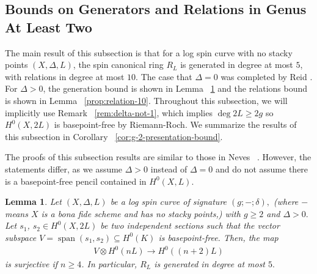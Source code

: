 \documentclass{amsart}
\theoremstyle{plain}
\newtheorem{lem}[thm]{Lemma}
\theoremstyle{definition}
\theoremstyle{remark}
\numberwithin{equation}{section}
\newcommand\ssec{\subsection}
\newcommand{\halfcan}{L}
\DeclareMathOperator{\newspan}{span}
\begin{document}
\ssec{Bounds on Generators and Relations in Genus At Least Two}
\label{ssec:bounds-high-genus}

The main result of this subsection is that for a log spin curve with no stacky points $(X, \Delta, L)$, the spin canonical ring $R_\halfcan$ is generated in degree at most $5$, with relations in degree at most $10$. The case that $\Delta = 0$ was completed by Reid \cite[Theorem 3.4]{reid:infinitesimal}. For $\Delta > 0$, the generation bound is shown in Lemma ~\ref{lem:generation-5} and the relations bound is shown in Lemma ~\ref{prop:relation-10}. Throughout this subsection, we will implicitly use Remark ~\ref{rem:delta-not-1}, which implies $\deg 2L \geq 2g$ so $H^0(X, 2L)$ is basepoint-free by Riemann-Roch. We summarize the results of this subsection in Corollary ~\ref{cor:g-2-presentation-bound}.

The proofs of this subsection results are similar to those in Neves ~\cite[Proposition III.4 and Proposition III.12]{neves:halfcan}. However, the statements differ, as we assume $\Delta > 0$ instead of $\Delta = 0$ and do not assume there is a basepoint-free pencil contained in $H^0(X, L).$ 

%

\begin{lem}
\label{lem:generation-5}
Let $(X, \Delta, L)$ be a log spin curve of signature $(g;-;\delta),$ {\rm(}where $-$ means $X$ is a bona fide scheme and has no stacky points,{\rm)}
with $g \geq 2$ and $\Delta > 0.$ Let $s_1$, $s_2 \in H^0(X, 2L)$
be two independent sections such that the vector subspace $V =
\newspan(s_1, s_2) \subseteq H^0(K)$ is basepoint-free. Then, the map
\begin{align*}
	V \otimes H^0(nL) \rightarrow H^0((n+2)L)
\end{align*}
is surjective if $n \geq 4$. In particular, $R_\halfcan$ is generated in degree at most $5.$
\end{lem}
\end{document}
